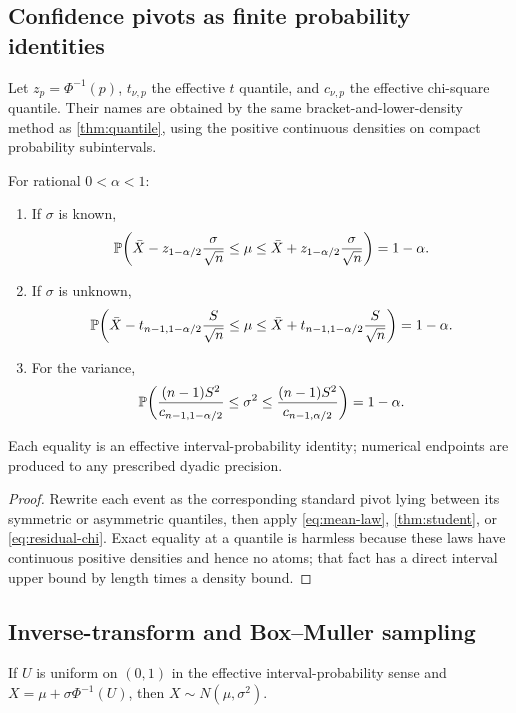 \subsection{Confidence pivots as finite probability identities}

Let $z_p=\Phi^{-1}(p)$, $t_{\nu,p}$ the effective $t$ quantile, and $c_{\nu,p}$ the effective chi-square quantile.  Their names are obtained by the same bracket-and-lower-density method as \cref{thm:quantile}, using the positive continuous densities on compact probability subintervals.

\begin{corollary}\label{cor:confidence}
For rational $0<\alpha<1$:
\begin{enumerate}[label=(\roman*)]
 \item If $\sigma$ is known,
 \[
  \mathbb P\!\left(
   \bar X-z_{1-\alpha/2}\frac{\sigma}{\sqrt n}
   \le\mu\le
   \bar X+z_{1-\alpha/2}\frac{\sigma}{\sqrt n}
  \right)=1-\alpha.
 \]
 \item If $\sigma$ is unknown,
 \[
  \mathbb P\!\left(
   \bar X-t_{n-1,1-\alpha/2}\frac{S}{\sqrt n}
   \le\mu\le
   \bar X+t_{n-1,1-\alpha/2}\frac{S}{\sqrt n}
  \right)=1-\alpha.
 \]
 \item For the variance,
 \[
  \mathbb P\!\left(
   \frac{(n-1)S^2}{c_{n-1,1-\alpha/2}}
   \le\sigma^2\le
   \frac{(n-1)S^2}{c_{n-1,\alpha/2}}
  \right)=1-\alpha.
 \]
\end{enumerate}
Each equality is an effective interval-probability identity; numerical endpoints are produced to any prescribed dyadic precision.
\end{corollary}

\begin{proof}
Rewrite each event as the corresponding standard pivot lying between its symmetric or asymmetric quantiles, then apply \cref{eq:mean-law}, \cref{thm:student}, or \cref{eq:residual-chi}.  Exact equality at a quantile is harmless because these laws have continuous positive densities and hence no atoms; that fact has a direct interval upper bound by length times a density bound.
\end{proof}

\subsection{Inverse-transform and Box--Muller sampling}

\begin{theorem}\label{thm:inverse-transform}
If $U$ is uniform on $(0,1)$ in the effective interval-probability sense and $X=\mu+\sigma\Phi^{-1}(U)$, then $X\sim N(\mu,\sigma^2)$.
\end{theorem}

